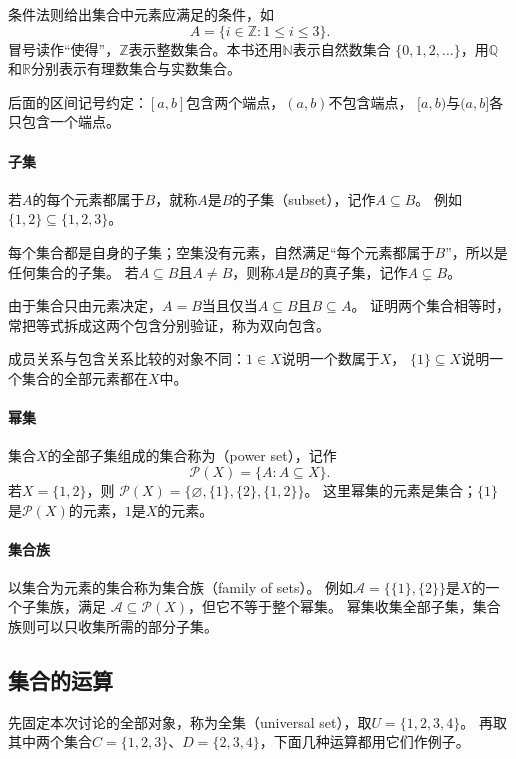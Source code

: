 条件法则给出集合中元素应满足的条件，如
\[
 A=\{i\in\mathbb Z:1\leq i\leq3\}.
\]
冒号读作“使得”，$\mathbb Z$表示整数集合。本书还用$\mathbb N$表示自然数集合
$\{0,1,2,\ldots\}$，用$\mathbb Q$和$\mathbb R$分别表示有理数集合与实数集合。

后面的区间记号约定：$[a,b]$包含两个端点，$(a,b)$不包含端点，
$[a,b)$与$(a,b]$各只包含一个端点。

\paragraph{子集}
若$A$的每个元素都属于$B$，就称$A$是$B$的子集（subset），记作$A\subseteq B$。
例如$\{1,2\}\subseteq\{1,2,3\}$。

每个集合都是自身的子集；空集没有元素，自然满足“每个元素都属于$B$”，所以是任何集合的子集。
若$A\subseteq B$且$A\neq B$，则称$A$是$B$的真子集，记作$A\subsetneq B$。

由于集合只由元素决定，$A=B$当且仅当$A\subseteq B$且$B\subseteq A$。
证明两个集合相等时，常把等式拆成这两个包含分别验证，称为双向包含。

成员关系与包含关系比较的对象不同：$1\in X$说明一个数属于$X$，
$\{1\}\subseteq X$说明一个集合的全部元素都在$X$中。

\paragraph{幂集}
集合$X$的全部子集组成的集合称为（power set），记作
\[
 \mathcal P(X)=\{A:A\subseteq X\}.
\]
若$X=\{1,2\}$，则
$\mathcal P(X)=\{\varnothing,\{1\},\{2\},\{1,2\}\}$。
这里幂集的元素是集合；$\{1\}$是$\mathcal P(X)$的元素，$1$是$X$的元素。

\paragraph{集合族}
以集合为元素的集合称为集合族（family of sets）。
例如$\mathcal A=\{\{1\},\{2\}\}$是$X$的一个子集族，满足
$\mathcal A\subseteq\mathcal P(X)$，但它不等于整个幂集。
幂集收集全部子集，集合族则可以只收集所需的部分子集。

\subsection{集合的运算}
\label{sec:prelim-set-operations}

先固定本次讨论的全部对象，称为全集（universal set），取$U=\{1,2,3,4\}$。
再取其中两个集合$C=\{1,2,3\}$、$D=\{2,3,4\}$，下面几种运算都用它们作例子。

